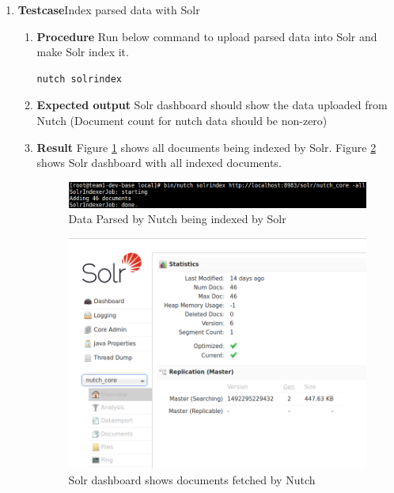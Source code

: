 \begin{enumerate}
\item \textbf{Testcase}\newline Index parsed data with Solr
  \begin{enumerate}[label={}]
  \item \textbf{Procedure}\newline
    Run below command to upload parsed data into Solr and make
    Solr index it.
    \begin{lstlisting}[style=Bash]
      nutch solrindex
    \end{lstlisting} 
  \item \textbf{Expected output}\newline
    Solr dashboard should show the data uploaded from Nutch (Document
    count for nutch data should be non-zero)
  \item \textbf{Result}\newline
    Figure \ref{nutch-index} shows all documents being indexed by
    Solr. Figure \ref{nutch-solr} shows Solr dashboard with all
    indexed documents.
    \begin{figure}
      \centering
      \includegraphics[scale=0.4]{screenshots/nutch-index.png}
      \caption{Data Parsed by Nutch being indexed by Solr}
      \label{nutch-index}
    \end{figure}

    \begin{figure}
      \centering
      \includegraphics[scale=0.4]{screenshots/nutch-solr.png}
      \caption{Solr dashboard shows documents fetched by Nutch}
      \label{nutch-solr}
    \end{figure}
  \end{enumerate}

\end{enumerate}



